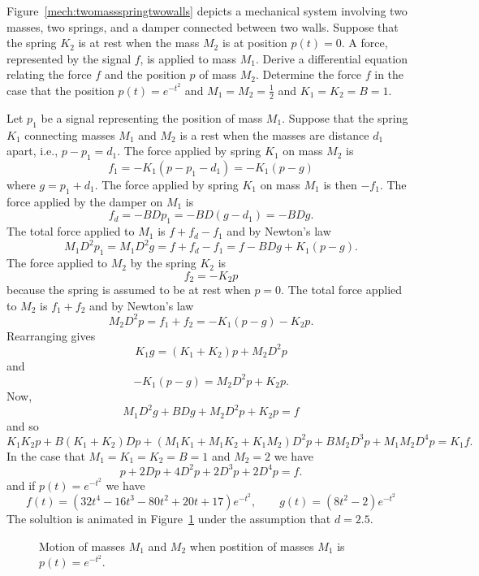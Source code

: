 \begin{excersizelist}
\begin{solution}
\end{solution}


\item \label{exer:twomassspringtwowalls} Figure~\ref{mech:twomassspringtwowalls} depicts a mechanical system involving two masses, two springs, and a damper connected between two walls.  Suppose that the spring $K_2$ is at rest when the mass $M_2$ is at position $p(t) = 0$.  A force, represented by the signal $f$, is applied to mass $M_1$.  Derive a differential equation relating the force $f$ and the position $p$ of mass $M_2$.  Determine the force $f$ in the case that the position $p(t) = e^{-t^2}$ and $M_1=M_2=\tfrac{1}{2}$ and $K_1 = K_2 = B = 1$.

\begin{solution}
Let $p_1$ be a signal representing the position of mass $M_1$.  Suppose that the spring $K_1$ connecting masses $M_1$ and $M_2$ is a rest when the masses are distance $d_1$ apart, i.e., $p - p_1 = d_1$.  The force applied by spring $K_1$ on mass $M_2$ is 
\[
f_1 = -K_1(p - p_1 - d_1) = -K_1(p - g)
\] 
where $g = p_1 + d_1$.  The force applied by spring $K_1$ on mass $M_1$ is then $-f_1$.  The force applied by the damper on $M_1$ is
\[
f_d = -BD p_1 = -BD(g - d_1) = - BD g.
\]
The total force applied to $M_1$ is $f + f_d - f_1$ and by Newton's law
\[
M_1 D^2 p_1 = M_1 D^2g = f + f_d - f_1 = f - BDg + K_1(p - g).
\]
The force applied to $M_2$ by the spring $K_2$ is
\[
f_2 = -K_2 p 
\] 
because the spring is assumed to be at rest when $p = 0$.  The total force applied to $M_2$ is $f_1 + f_2$ and by Newton's law
\[
M_2 D^2p = f_1 + f_2 =  -K_1(p - g) - K_2p.
\]
Rearranging gives
\[
K_1 g = (K_1+K_2)p + M_2 D^2p
\]
and
\[
-K_1(p - g) = M_2 D^2p  + K_2p .
\]
Now,
\[
M_1 D^2g + BDg + M_2 D^2p  + K_2p = f 
\]
and so
\[
K_1K_2 p + B(K_1+K_2)Dp + (M_1K_1 + M_1K_2 + K_1 M_2) D^2p  + BM_2D^3p + M_1M_2 D^4p = K_1 f .
\]
In the case that $M_1 = K_1 = K_2 = B = 1$ and $M_2 = 2$ we have
\[
p + 2Dp + 4D^2p + 2D^3p + 2D^4p = f.
\]
and if $p(t) = e^{-t^2}$ we have
\[
f(t) = (32 t^4-16 t^3-80 t^2+20 t+17) e^{-t^2}, \qquad g(t)=(8 t^2 - 2) e^{- t^2 }
\]
The solultion is animated in Figure~\ref{fig:twomassestwowallsanimanim} under the assumption that $d = 2.5$.

\begin{figure}[tp]
  \centering
  \caption{Motion of masses $M_1$ and $M_2$ when postition of masses $M_1$ is $p(t) = e^{-t^2}$.} \label{fig:twomassestwowallsanimanim}
\end{figure}



\end{solution}
\end{excersizelist}
